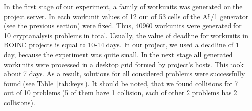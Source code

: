 \documentclass[runningheads,a4paper]{llncs}[2015/06/24]
\begin{document}

In the first stage of our experiment, a family of workunits was generated on 
the project server. In each workunit values of 12 out of 53 cells of the A5/1 generator (see the previous section) 
were fixed. Thus, 40960 workunits were generated for 10 cryptanalysis problems in total. Usually, the
value of deadline for workunits in BOINC projects is equal to 10-14 days. In
our project, we used a deadline of 1 day, because the experiment was quite
small. In the next stage all generated workunits were processed in a desktop
grid formed by project's hosts. This took about 7 days. As a result, solutions
for all considered problems were successfully found (see Table~\ref{tab:keys}). It should be noted, 
that we found collisions for 7 out of 10 problems (5 of them have 1 collision, each of other 2 problems has 2
collisions).
\end{document}
